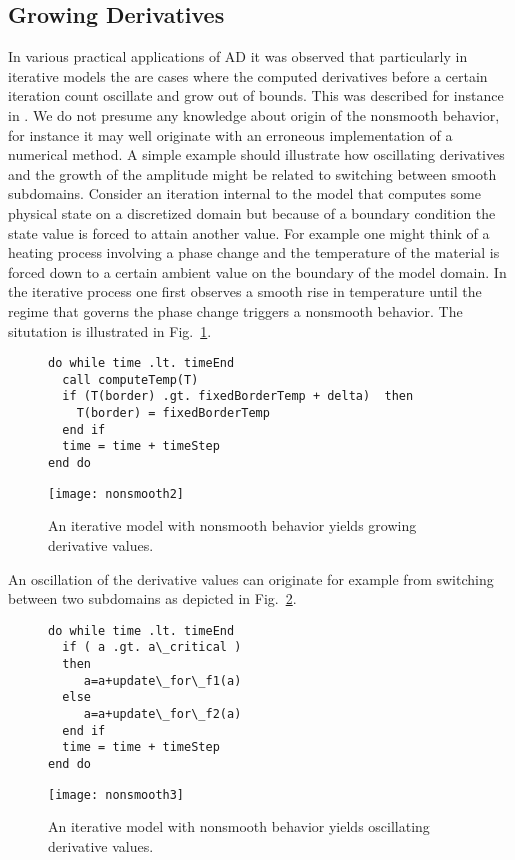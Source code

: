 \documentclass{article}
\newcommand{\reffig}[1]{{Fig.~\ref{#1}}}
\begin{document}
\subsection{Growing Derivatives}
In various practical applications of AD it was observed that particularly in iterative
models the are cases where the  computed derivatives before a certain iteration count 
oscillate and grow out of bounds. 
This was described for instance in \cite{tfs-delayed}. 
We do not presume any knowledge about origin of the nonsmooth behavior, for instance
it may well originate with an erroneous implementation of a numerical method. 
A simple example should illustrate how oscillating derivatives and the growth 
of the amplitude might be related to switching between smooth subdomains. 
Consider an iteration internal to the model that computes some physical state 
on a discretized domain but because of a boundary condition the state value is 
forced to attain another value. For example one might think of a heating process involving 
a phase change and the temperature of the material is forced down to a certain ambient 
value on the boundary of the model domain. 
In the iterative process one first observes a smooth rise in temperature until the 
regime that governs the phase change triggers a nonsmooth behavior. 
The situtation is illustrated in \reffig{fig:growingExample}.
\begin{figure}
\begin{lstlisting}
do while time .lt. timeEnd
  call computeTemp(T)
  if (T(border) .gt. fixedBorderTemp + delta)  then 
    T(border) = fixedBorderTemp 
  end if
  time = time + timeStep
end do  
\end{lstlisting}
\texttt{[image: nonsmooth2]}
\caption{An iterative model with nonsmooth behavior yields 
growing derivative values.}\label{fig:growingExample} 
\end{figure}
An oscillation of the derivative values can originate for example from 
switching between two subdomains as depicted in  \reffig{fig:oscillatingExample}.
\begin{figure}
\begin{lstlisting}
do while time .lt. timeEnd
  if ( a .gt. a\_critical ) 
  then
     a=a+update\_for\_f1(a)
  else 	
     a=a+update\_for\_f2(a)
  end if
  time = time + timeStep
end do  
\end{lstlisting}
\texttt{[image: nonsmooth3]}
\caption{An iterative model with nonsmooth behavior yields 
oscillating derivative values.}\label{fig:oscillatingExample} 
\end{figure}
\end{document}
